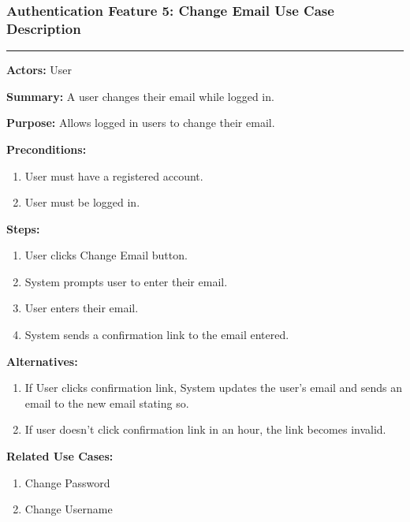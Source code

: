 \documentclass[twoside,letterpaper]{article}
\begin{document}
\newpage

\subsubsection[Authentication Feature 5: Change Email Use Case Description]{\rmfamily\bfseries\color{black}
	Authentication Feature 5: Change Email Use Case Description}
\hypertarget{RefHeading22059017292}{}

\hrule
\vspace{8pt}
\noindent\textbf{Actors:} User \newline

\noindent\textbf{Summary:} A user changes their email while logged in.  \newline

\noindent\textbf{Purpose:} Allows logged in users to change their email.  \newline

\noindent\textbf{Preconditions:}
\begin{enumerate}
	\item User must have a registered account.
	\item User must be logged in.
\end{enumerate}

\noindent\textbf{Steps:}
\begin{enumerate}
	\item User clicks Change Email button.
	\item System prompts user to enter their email.
	\item User enters their email.
	\item System sends a confirmation link to the email entered.
\end{enumerate}

\noindent\textbf{Alternatives:}
\begin{enumerate}
	\item If User clicks confirmation link, System updates the user's email and sends an email to the new email stating so.
	\item If user doesn't click confirmation link in an hour, the link becomes invalid.
\end{enumerate}

\noindent\textbf{Related Use Cases:}
\begin{enumerate}
	\item Change Password
	\item Change Username
\end{enumerate}
\end{document}
